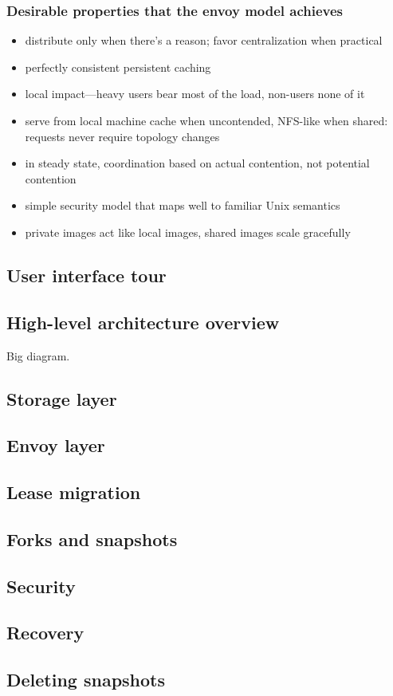 \subsubsection{Desirable properties that the envoy model achieves}
\begin{itemize}
\item distribute only when there's a reason; favor centralization when practical
\item perfectly consistent persistent caching
\item local impact---heavy users bear most of the load, non-users none of it
\item serve from local machine cache when uncontended, NFS-like when shared: requests never require topology changes
\item in steady state, coordination based on actual contention, not potential contention
\item simple security model that maps well to familiar Unix semantics
\item private images act like local images, shared images scale gracefully
\end{itemize}

\subsection{User interface tour}
\subsection{High-level architecture overview}
Big diagram.
\subsection{Storage layer}
\subsection{Envoy layer}
\subsection{Lease migration}
\subsection{Forks and snapshots}
\subsection{Security}
\subsection{Recovery}
\subsection{Deleting snapshots}